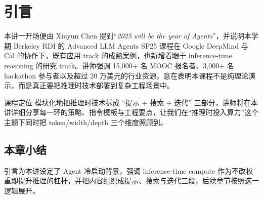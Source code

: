 \section{引言}
本讲一开场便由 Xinyun Chen 提到“\textit{2025 will be the year of Agents}”，并说明本学期 Berkeley RDI 的 Advanced LLM Agents SP25 课程在 Google DeepMind 与 Cal 的协作下，既有应用 track 的成熟案例，也新增着眼于 inference-time reasoning 的研究 track。讲师强调 15,000+ 名 MOOC 报名者、3,000+ 名 hackathon 参与者以及超过 20 万美元的行业资源，意在表明本课程不是纯理论演示，而是真正要把推理时技术部署到复杂工程场景中。

\begin{knowledgebox}{课程定位}
模块化地把推理时技术拆成 “提示 + 搜索 + 迭代” 三部分，讲师将在本讲详细分享每一环的策略、指令模板与工程要点，让我们在“推理时投入算力”这个主题下同时把 token/width/depth 三个维度照顾到。
\end{knowledgebox}

\subsection{本章小结}
引言为本讲设定了 Agent 冷启动背景，强调 inference-time compute 作为不改权重即提升推理的杠杆，并把内容组织成提示、搜索与迭代三段，后续章节按照这一逻辑展开。

